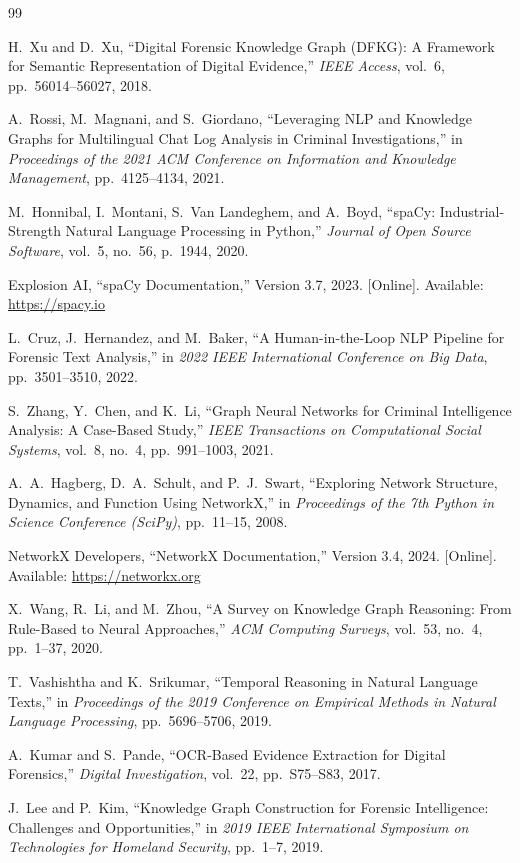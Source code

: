 \documentclass{ieeeaccess}
\begin{document}
\begin{thebibliography}{99}

H.~Xu and D.~Xu, ``Digital Forensic Knowledge Graph (DFKG): A Framework for Semantic Representation of Digital Evidence,'' \emph{IEEE Access}, vol.~6, pp.~56014--56027, 2018.

A.~Rossi, M.~Magnani, and S.~Giordano, ``Leveraging NLP and Knowledge Graphs for Multilingual Chat Log Analysis in Criminal Investigations,'' in \emph{Proceedings of the 2021 ACM Conference on Information and Knowledge Management}, pp.~4125--4134, 2021.

M.~Honnibal, I.~Montani, S.~Van Landeghem, and A.~Boyd, ``spaCy: Industrial-Strength Natural Language Processing in Python,'' \emph{Journal of Open Source Software}, vol.~5, no.~56, p.~1944, 2020.

Explosion AI, ``spaCy Documentation,'' Version 3.7, 2023. [Online]. Available: \url{https://spacy.io}

L.~Cruz, J.~Hernandez, and M.~Baker, ``A Human-in-the-Loop NLP Pipeline for Forensic Text Analysis,'' in \emph{2022 IEEE International Conference on Big Data}, pp.~3501--3510, 2022.

S.~Zhang, Y.~Chen, and K.~Li, ``Graph Neural Networks for Criminal Intelligence Analysis: A Case-Based Study,'' \emph{IEEE Transactions on Computational Social Systems}, vol.~8, no.~4, pp.~991--1003, 2021.

A.~A.~Hagberg, D.~A.~Schult, and P.~J.~Swart, ``Exploring Network Structure, Dynamics, and Function Using NetworkX,'' in \emph{Proceedings of the 7th Python in Science Conference (SciPy)}, pp.~11--15, 2008.

NetworkX Developers, ``NetworkX Documentation,'' Version 3.4, 2024. [Online]. Available: \url{https://networkx.org}

X.~Wang, R.~Li, and M.~Zhou, ``A Survey on Knowledge Graph Reasoning: From Rule-Based to Neural Approaches,'' \emph{ACM Computing Surveys}, vol.~53, no.~4, pp.~1--37, 2020.

T.~Vashishtha and K.~Srikumar, ``Temporal Reasoning in Natural Language Texts,'' in \emph{Proceedings of the 2019 Conference on Empirical Methods in Natural Language Processing}, pp.~5696--5706, 2019.

A.~Kumar and S.~Pande, ``OCR-Based Evidence Extraction for Digital Forensics,'' \emph{Digital Investigation}, vol.~22, pp.~S75--S83, 2017.

J.~Lee and P.~Kim, ``Knowledge Graph Construction for Forensic Intelligence: Challenges and Opportunities,'' in \emph{2019 IEEE International Symposium on Technologies for Homeland Security}, pp.~1--7, 2019.

\end{thebibliography}

\EOD
\end{document}
